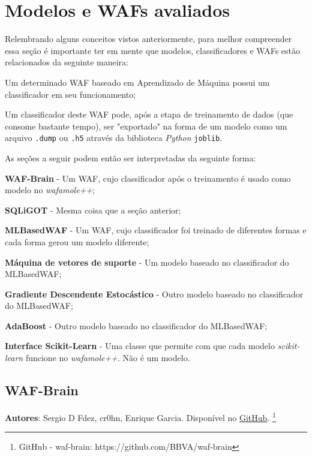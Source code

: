 \bigskip

\section{Modelos e WAFs avaliados}

Relembrando alguns conceitos vistos anteriormente, para melhor compreender essa seção é importante ter em mente que modelos, classificadores e WAFs estão relacionados da seguinte maneira: 

\begin{alineas}
\item Um determinado WAF baseado em Aprendizado de Máquina possui um classificador em seu funcionamento;
\item Um classificador deste WAF pode, após a etapa de treinamento de dados (que consome bastante tempo), ser "exportado" na forma de um modelo como um arquivo \verb+.dump+ ou \verb+.h5+ através da biblioteca \textit{Python} \verb+joblib+.
\end{alineas}

As seções a seguir podem então ser interpretadas da seguinte forma:
\begin{alineas}
\item \textbf{WAF-Brain} - Um WAF, cujo classificador após o treinamento é usado como modelo no \textit{wafamole++};
\item \textbf{SQLiGOT} - Mesma coisa que a seção anterior;
\item \textbf{MLBasedWAF} - Um WAF, cujo classificador foi treinado de diferentes formas e cada forma gerou um modelo diferente;
\item \textbf{Máquina de vetores de suporte} - Um modelo baseado no classificador do MLBasedWAF;
\item \textbf{Gradiente Descendente Estocástico} - Outro modelo baseado no classificador do MLBasedWAF;
\item \textbf{AdaBoost} - Outro modelo baseado no classificador do MLBasedWAF;
\item \textbf{Interface Scikit-Learn} - Uma classe que permite com que cada modelo \textit{scikit-learn} funcione no \textit{wafamole++}. Não é um modelo.
\end{alineas}
\subsection{WAF-Brain}

\textbf{Autores}: Sergio D Fdez, cr0hn, Enrique Garcia. Disponível no \href{https://github.com/BBVA/waf-brain}{GitHub}. \footnote{GitHub - waf-brain: https://github.com/BBVA/waf-brain}

